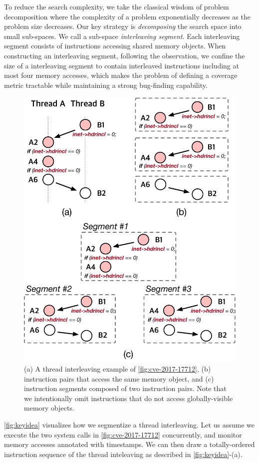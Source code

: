 %
To reduce the search complexity, we take the classical wisdom of
problem decomposition where the complexity of a problem exponentially
decreases as the problem size decreases.
%
Our key strategy is \textit{decomposing} the search space into small
sub-spaces. We call a sub-space \textit{interleaving segment}.
%
Each interleaving segment consists of instructions accessing 
shared memory objects.
%
%
When constructing an interleaving segment, following the observation, 
we confine the size of a interleaving segment 
to contain interleaved instructions including at most four memory accesses,
which makes the problem of defining a coverage metric tractable while maintaining a strong bug-finding capability.


%
\begin{figure}[t]
  \centering
  \includegraphics[width=0.8\linewidth]{fig/intuition.pdf}
  \caption{(a) A thread interleaving example of
    \autoref{fig:cve-2017-17712}, (b) instruction pairs that access
    the same memory object, and (c) instruction segments composed of
    two instruction pairs.  Note that we intentionally omit
    instructions that do not access globally-visible memory
    objects.}
  \label{fig:keyidea}
\end{figure}
%
\autoref{fig:keyidea} visualizes how we segmentize a thread
interleaving.
%
Let us assume we execute the two system calls in
\autoref{fig:cve-2017-17712} concurrently, and monitor memory accesses
annotated with timestamps.
%
We can then draw a totally-ordered instruction sequence of the thread
inteleaving as described in \autoref{fig:keyidea}-(a).
%

